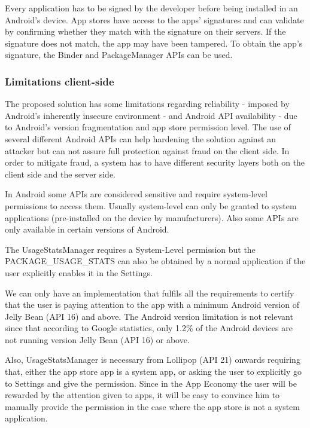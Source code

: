 Every application has to be signed by the developer before being installed in an Android's device. App stores have access to the apps' signatures and can validate by confirming whether they match with the signature on their servers. If the signature does not match, the app may have been tampered. To obtain the app's signature, the Binder and PackageManager APIs can be used.

\subsubsection{Limitations client-side}

The proposed solution has some limitations regarding reliability - imposed by Android's inherently insecure environment - and Android API availability - due to Android's version fragmentation and app store permission level. The use of several different Android APIs can help hardening the solution against an attacker but can not assure full protection against fraud on the client side. In order to mitigate fraud, a system has to have different security layers both on the client side and the server side. 

In Android some APIs are considered sensitive and require system-level permissions to access them. Usually system-level can only be granted to system applications (pre-installed on the device by manufacturers). Also some APIs are only available in certain versions of Android. %



The UsageStatsManager requires a System-Level permission but the PACKAGE\_USAGE\_STATS can also be obtained by a normal application if the user explicitly enables it in the Settings.

We can only have an implementation that fulfils all the requirements to certify that the user is paying attention to the app with a minimum Android version of Jelly Bean (API 16) and above. The Android version limitation is not relevant since that according to Google statistics, only 1.2\% of the Android devices are not running version Jelly Bean (API 16) or above. %

Also, UsageStatsManager is necessary from Lollipop (API 21) onwards requiring that, either the app store app is a system app, or asking the user to explicitly go to Settings and give the permission. Since in the App Economy the user will be rewarded by the attention given to apps, it will be easy to convince him to manually provide the permission in the case where the app store is not a system application.


